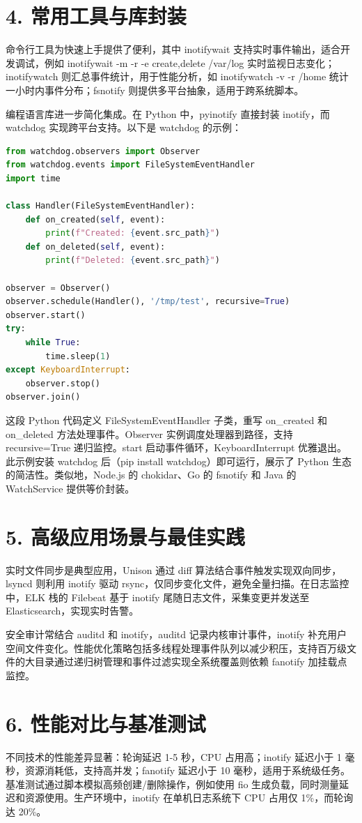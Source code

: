 \chapter{4. 常用工具与库封装}
命令行工具为快速上手提供了便利，其中 inotifywait 支持实时事件输出，适合开发调试，例如 inotifywait -m -r -e create,delete /var/log 实时监视日志变化；inotifywatch 则汇总事件统计，用于性能分析，如 inotifywatch -v -r /home 统计一小时内事件分布；fsnotify 则提供多平台抽象，适用于跨系统脚本。\par
编程语言库进一步简化集成。在 Python 中，pyinotify 直接封装 inotify，而 watchdog 实现跨平台支持。以下是 watchdog 的示例：\par
\begin{lstlisting}[language=python]
from watchdog.observers import Observer
from watchdog.events import FileSystemEventHandler
import time

class Handler(FileSystemEventHandler):
    def on_created(self, event):
        print(f"Created: {event.src_path}")
    def on_deleted(self, event):
        print(f"Deleted: {event.src_path}")

observer = Observer()
observer.schedule(Handler(), '/tmp/test', recursive=True)
observer.start()
try:
    while True:
        time.sleep(1)
except KeyboardInterrupt:
    observer.stop()
observer.join()
\end{lstlisting}
这段 Python 代码定义 FileSystemEventHandler 子类，重写 on\_{}created 和 on\_{}deleted 方法处理事件。Observer 实例调度处理器到路径，支持 recursive=True 递归监控。start 启动事件循环，KeyboardInterrupt 优雅退出。此示例安装 watchdog 后（pip install watchdog）即可运行，展示了 Python 生态的简洁性。类似地，Node.js 的 chokidar、Go 的 fsnotify 和 Java 的 WatchService 提供等价封装。\par
\chapter{5. 高级应用场景与最佳实践}
实时文件同步是典型应用，Unison 通过 diff 算法结合事件触发实现双向同步，lsyncd 则利用 inotify 驱动 rsync，仅同步变化文件，避免全量扫描。在日志监控中，ELK 栈的 Filebeat 基于 inotify 尾随日志文件，采集变更并发送至 Elasticsearch，实现实时告警。\par
安全审计常结合 auditd 和 inotify，auditd 记录内核审计事件，inotify 补充用户空间文件变化。性能优化策略包括多线程处理事件队列以减少积压，支持百万级文件的大目录通过递归树管理和事件过滤实现全系统覆盖则依赖 fanotify 加挂载点监控。\par
\chapter{6. 性能对比与基准测试}
不同技术的性能差异显著：轮询延迟 1-5 秒，CPU 占用高；inotify 延迟小于 1 毫秒，资源消耗低，支持高并发；fanotify 延迟小于 10 毫秒，适用于系统级任务。基准测试通过脚本模拟高频创建/删除操作，例如使用 fio 生成负载，同时测量延迟和资源使用。生产环境中，inotify 在单机日志系统下 CPU 占用仅 1\%{}，而轮询达 20\%{}。\par
